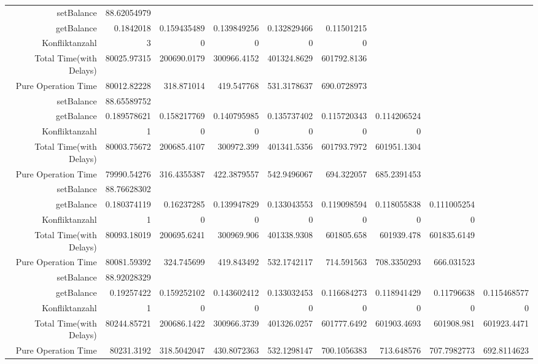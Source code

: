 \begin{landscape}
\begin{table}[htbp]
\begin{tabular}{rrrrrrrrr}
    \cline{1-9}
    setBalance & 88.62054979 &       &       &       &       &       &       &  \\
    getBalance & 0.1842018 & 0.159435489 & 0.139849256 & 0.132829466 & 0.11501215 &       &       &  \\
    Konfliktanzahl & 3     & 0     & 0     & 0     & 0     &       &       &  \\
    Total Time(with Delays) & 80025.97315 & 200690.0179 & 300966.4152 & 401324.8629 & 601792.8136 &       &       &  \\
    Pure Operation Time & 80012.82228 & 318.871014 & 419.547768 & 531.3178637 & 690.0728973 &       &       &  \\
\cline{1-9}    
    setBalance & 88.65589752 &       &       &       &       &       &       &  \\
    getBalance & 0.189578621 & 0.158217769 & 0.140795985 & 0.135737402 & 0.115720343 & 0.114206524 &       &  \\
    Konfliktanzahl & 1     & 0     & 0     & 0     & 0     & 0     &       &  \\
    Total Time(with Delays) & 80003.75672 & 200685.4107 & 300972.399 & 401341.5356 & 601793.7972 & 601951.1304 &       &  \\
    Pure Operation Time & 79990.54276 & 316.4355387 & 422.3879557 & 542.9496067 & 694.322057 & 685.2391453 &       &  \\
\cline{1-9}    
    setBalance & 88.76628302 &       &       &       &       &       &       &  \\
    getBalance & 0.180374119 & 0.16237285 & 0.139947829 & 0.133043553 & 0.119098594 & 0.118055838 & 0.111005254 &  \\
    Konfliktanzahl & 1     & 0     & 0     & 0     & 0     & 0     & 0     &  \\
    Total Time(with Delays) & 80093.18019 & 200695.6241 & 300969.906 & 401338.9308 & 601805.658 & 601939.478 & 601835.6149 &  \\
    Pure Operation Time & 80081.59392 & 324.745699 & 419.843492 & 532.1742117 & 714.591563 & 708.3350293 & 666.031523 &  \\
\cline{1-9}    
    setBalance & 88.92028329 &       &       &       &       &       &       &  \\
    getBalance & 0.19257422 & 0.159252102 & 0.143602412 & 0.133032453 & 0.116684273 & 0.118941429 & 0.11796638 & 0.115468577 \\
    Konfliktanzahl & 1     & 0     & 0     & 0     & 0     & 0     & 0     & 0 \\
    Total Time(with Delays) & 80244.85721 & 200686.1422 & 300966.3739 & 401326.0257 & 601777.6492 & 601903.4693 & 601908.981 & 601923.4471 \\
    Pure Operation Time & 80231.3192 & 318.5042047 & 430.8072363 & 532.1298147 & 700.1056383 & 713.648576 & 707.7982773 & 692.8114623 \\
    \bottomrule
    \end{tabular}%
  \label{tab:addlabel}%
\end{table}%
\end{landscape}



